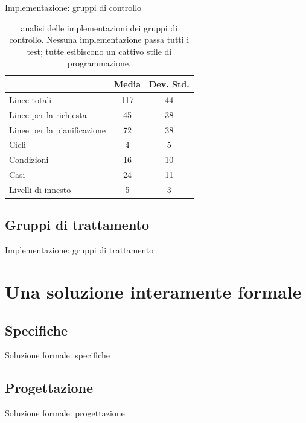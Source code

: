 \documentclass{beamer}
\begin{document}
\begin{frame}{Implementazione: gruppi di controllo}
	\begin{table}
		\begin{tabular}{|l|c|c|}
			\hline
			                            & Media & Dev. Std. \\
			\hline
			Linee totali                & 117   & 44        \\
			\hline
			Linee per la richiesta      & 45    & 38        \\
			\hline
			Linee per la pianificazione & 72    & 38        \\
			\hline
			Cicli                       & 4     & 5         \\
			\hline
			Condizioni                  & 16    & 10        \\
			\hline
			Casi                        & 24    & 11        \\
			\hline
			Livelli di innesto          & 5     & 3         \\
			\hline
		\end{tabular}
		\caption{analisi delle implementazioni dei gruppi di controllo. Nessuna
			implementazione passa tutti i test; tutte esibiscono un cattivo stile di
			programmazione.}
	\end{table}
\end{frame}

\subsection{Gruppi di trattamento}
\begin{frame}{Implementazione: gruppi di trattamento}
\end{frame}

\section{Una soluzione interamente formale}

\subsection{Specifiche}
\begin{frame}{Soluzione formale: specifiche}

\end{frame}

\subsection{Progettazione}
\begin{frame}{Soluzione formale: progettazione}

\end{frame}
\end{document}
